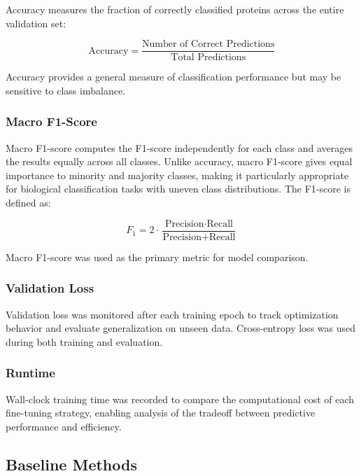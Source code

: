 \documentclass{article}
\begin{document}
Accuracy measures the fraction of correctly classified proteins across the entire validation set:

\begin{equation}
    \text{Accuracy} = \frac{\text{Number of Correct Predictions}}{\text{Total Predictions}}
\end{equation}

Accuracy provides a general measure of classification performance but may be sensitive to class imbalance.

\subsubsection{Macro F1-Score}

Macro F1-score computes the F1-score independently for each class and averages the results equally across all classes. Unlike accuracy, macro F1-score gives equal importance to minority and majority classes, making it particularly appropriate for biological classification tasks with uneven class distributions. The F1-score is defined as:

\begin{equation}
    F_1 = 2 \cdot \frac{\text{Precision} \cdot \text{Recall}}{\text{Precision} + \text{Recall}}
\end{equation}

Macro F1-score was used as the primary metric for model comparison.

\subsubsection{Validation Loss}

Validation loss was monitored after each training epoch to track optimization behavior and evaluate generalization on unseen data. Cross-entropy loss was used during both training and evaluation.

\subsubsection{Runtime}

Wall-clock training time was recorded to compare the computational cost of each fine-tuning strategy, enabling analysis of the tradeoff between predictive performance and efficiency.

\subsection{Baseline Methods}
\end{document}
